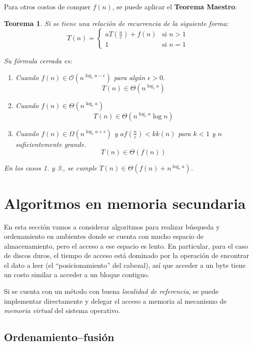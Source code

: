 \documentclass{article}
\newcommand{\BigO}[1]{{\mathcal{O}(#1)}}
\newcommand{\BigOmega}[1]{{\Omega(#1)}}
\newcommand{\BigTheta}[1]{{\Theta(#1)}}
\newtheorem*{theorem*}{Teorema}
\begin{document}
Para otros costos de conquer $f(n)$, se puede aplicar el \textbf{Teorema Maestro}:

\begin{theorem*}
    Si se tiene una relación de recurrencia de la siguiente forma:
    $$
    T(n) =
    \begin{cases}
        a T\left(\frac{n}{c}\right) + f(n) & \text{si } n > 1 \\
        1                       & \text{si } n = 1
    \end{cases}
    $$

    Su fórmula cerrada es:
    \begin{enumerate}
        \item Cuando $f(n) \in \BigO{n^{\log_c{a} - \epsilon}}$ para algún $\epsilon > 0$.
            $$T(n) \in \BigTheta{n^{\log_c{a}}}$$
        \item Cuando $f(n) \in \BigTheta{n^{\log_c{a}}}$
            $$T(n) \in \BigTheta{n^{\log_c{a}} \log{n}}$$
        \item Cuando $f(n) \in \BigOmega{n^{\log_c{a} + \epsilon}}$ y $a f\left(\frac{n}{c}\right) < k k(n)$ para $k < 1$ y $n$ suficientemente grande.
            $$T(n) \in \BigTheta{f(n)}$$
    \end{enumerate}

    En los casos 1. y 3., se cumple $T(n) \in \BigTheta{f(n) + n^{\log_c{a}}}$.
\end{theorem*}

\section{Algoritmos en memoria secundaria}

En esta sección vamos a considerar algoritmos para realizar búsqueda y ordenamiento en ambientes donde se cuenta con mucho espacio de almacenamiento, pero el acceso a ese espacio es lento. En particular, para el caso de discos duros, el tiempo de acceso está dominado por la operación de encontrar el dato a leer (el ``posicionamiento'' del cabezal), así que acceder a un byte tiene un costo similar a acceder a un bloque contiguo.

Si se cuenta con un método con buena \textit{localidad de referencia}, se puede implementar directamente y delegar el acceso a memoria al mecanismo de \textit{memoria virtual} del sistema operativo.

\subsection{Ordenamiento--fusión}
\end{document}
